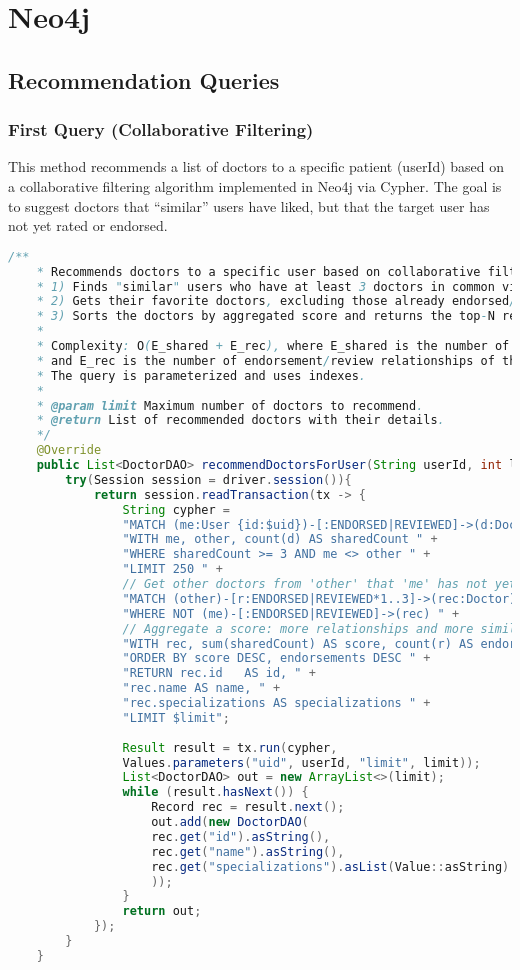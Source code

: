 \section{Neo4j}
\subsection{Recommendation Queries}
\subsubsection{First Query (Collaborative Filtering)}
This method recommends a list of doctors to a specific patient (userId) based on a collaborative filtering algorithm implemented in Neo4j via Cypher. The goal is to suggest doctors that “similar” users have liked, but that the target user has not yet rated or endorsed. 

\begin{lstlisting}[language=java, caption={Java code for the Recommendations with Collaborative Filtering}
	]
	/**
	* Recommends doctors to a specific user based on collaborative filtering:
	* 1) Finds "similar" users who have at least 3 doctors in common via endorsement/review.
	* 2) Gets their favorite doctors, excluding those already endorsed/reviewed by the target user.
	* 3) Sorts the doctors by aggregated score and returns the top-N results.
	*
	* Complexity: O(E_shared + E_rec), where E_shared is the number of shared relationships
	* and E_rec is the number of endorsement/review relationships of the similar users.
	* The query is parameterized and uses indexes.
	*
	* @param limit Maximum number of doctors to recommend.
	* @return List of recommended doctors with their details.
	*/
	@Override
	public List<DoctorDAO> recommendDoctorsForUser(String userId, int limit){
		try(Session session = driver.session()){
			return session.readTransaction(tx -> {
				String cypher =
				"MATCH (me:User {id:$uid})-[:ENDORSED|REVIEWED]->(d:Doctor)<-[:ENDORSED|REVIEWED]-(other:User) " +
				"WITH me, other, count(d) AS sharedCount " +
				"WHERE sharedCount >= 3 AND me <> other " +
				"LIMIT 250 " +
				// Get other doctors from 'other' that 'me' has not yet endorsed/reviewed
				"MATCH (other)-[r:ENDORSED|REVIEWED*1..3]->(rec:Doctor) " +
				"WHERE NOT (me)-[:ENDORSED|REVIEWED]->(rec) " +
				// Aggregate a score: more relationships and more similar users increase the score
				"WITH rec, sum(sharedCount) AS score, count(r) AS endorsements " +
				"ORDER BY score DESC, endorsements DESC " +
				"RETURN rec.id   AS id, " +
				"rec.name AS name, " +
				"rec.specializations AS specializations " +
				"LIMIT $limit";
				
				Result result = tx.run(cypher,
				Values.parameters("uid", userId, "limit", limit));
				List<DoctorDAO> out = new ArrayList<>(limit);
				while (result.hasNext()) {
					Record rec = result.next();
					out.add(new DoctorDAO(
					rec.get("id").asString(),
					rec.get("name").asString(),
					rec.get("specializations").asList(Value::asString)
					));
				}
				return out;
			});
		}
	}
\end{lstlisting}

